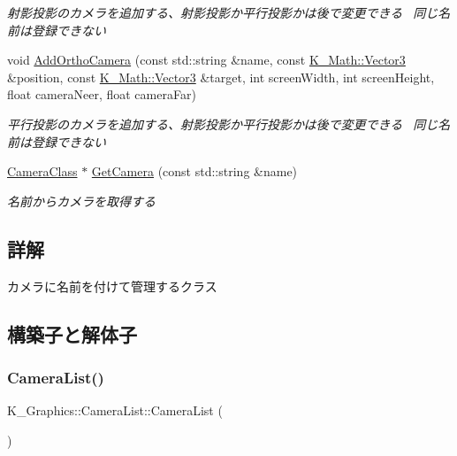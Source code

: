 \begin{DoxyCompactItemize}
\begin{DoxyCompactList}\small\item\em 射影投影のカメラを追加する、射影投影か平行投影かは後で変更できる~\newline
同じ名前は登録できない \end{DoxyCompactList}\item 
void \mbox{\hyperlink{class_k___graphics_1_1_camera_list_ae3e95b8007efa81d1552e05a1b6df63b}{Add\+Ortho\+Camera}} (const std\+::string \&name, const \mbox{\hyperlink{namespace_k___math_a66884d78082c39ada4091c211f3570f8}{K\+\_\+\+Math\+::\+Vector3}} \&position, const \mbox{\hyperlink{namespace_k___math_a66884d78082c39ada4091c211f3570f8}{K\+\_\+\+Math\+::\+Vector3}} \&target, int screen\+Width, int screen\+Height, float camera\+Neer, float camera\+Far)
\begin{DoxyCompactList}\small\item\em 平行投影のカメラを追加する、射影投影か平行投影かは後で変更できる~\newline
同じ名前は登録できない \end{DoxyCompactList}\item 
\mbox{\hyperlink{class_k___graphics_1_1_camera_class}{Camera\+Class}} $\ast$ \mbox{\hyperlink{class_k___graphics_1_1_camera_list_aa4f8101671c5d4c548853891738b6265}{Get\+Camera}} (const std\+::string \&name)
\begin{DoxyCompactList}\small\item\em 名前からカメラを取得する \end{DoxyCompactList}\end{DoxyCompactItemize}


\subsection{詳解}
カメラに名前を付けて管理するクラス 

\subsection{構築子と解体子}
\mbox{\label{class_k___graphics_1_1_camera_list_a83eea14d2963da7f46309fc06675da86}} 
\subsubsection{\texorpdfstring{Camera\+List()}{CameraList()}}
{\footnotesize\ttfamily K\+\_\+\+Graphics\+::\+Camera\+List\+::\+Camera\+List (\begin{DoxyParamCaption}{ }\end{DoxyParamCaption})}



